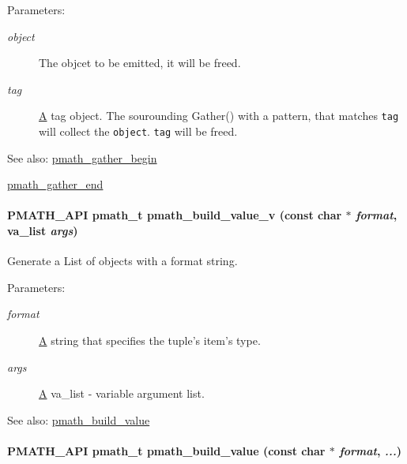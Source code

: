 \begin{Desc}
\item[Parameters:]
\begin{description}
\item[{\em object}]The objcet to be emitted, it will be freed. \item[{\em tag}]\hyperlink{class_a}{A} tag object. The sourounding Gather() with a pattern, that matches {\tt tag} will collect the {\tt object}. {\tt tag} will be freed.\end{description}
\end{Desc}
\begin{Desc}
\item[See also:]\hyperlink{group__helpers_g077f3730ca4275b87d9a35bce6013e45}{pmath\_\-gather\_\-begin} 

\hyperlink{group__helpers_ga2f732b35703986263e3a15592b4a46e}{pmath\_\-gather\_\-end} \end{Desc}
\hypertarget{group__helpers_g96660afa0732edf675653eb6ddeab0a4}{
\paragraph[{pmath\_\-build\_\-value\_\-v}]{\setlength{\rightskip}{0pt plus 5cm}PMATH\_\-API {\bf pmath\_\-t} pmath\_\-build\_\-value\_\-v (const char $\ast$ {\em format}, \/  va\_\-list {\em args})}\hfill}
\label{group__helpers_g96660afa0732edf675653eb6ddeab0a4}


Generate a List of objects with a format string. 

\begin{Desc}
\item[Parameters:]
\begin{description}
\item[{\em format}]\hyperlink{class_a}{A} string that specifies the tuple's item's type. \item[{\em args}]\hyperlink{class_a}{A} va\_\-list - variable argument list.\end{description}
\end{Desc}
\begin{Desc}
\item[See also:]\hyperlink{group__helpers_g13a748aa283c5f5408cce037d3ad224d}{pmath\_\-build\_\-value} \end{Desc}
\hypertarget{group__helpers_g13a748aa283c5f5408cce037d3ad224d}{
\paragraph[{pmath\_\-build\_\-value}]{\setlength{\rightskip}{0pt plus 5cm}PMATH\_\-API {\bf pmath\_\-t} pmath\_\-build\_\-value (const char $\ast$ {\em format}, \/   {\em ...})}\hfill}
\label{group__helpers_g13a748aa283c5f5408cce037d3ad224d}


